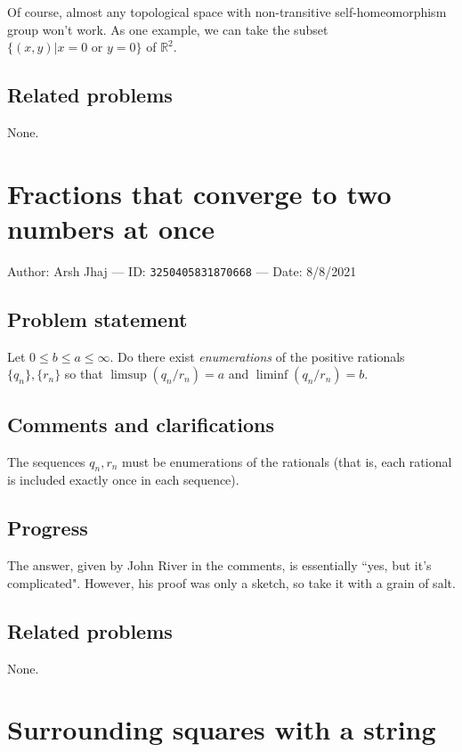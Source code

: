 \documentclass[10pt]{article}
\begin{document}
Of course, almost any topological space with non-transitive self-homeomorphism group won't work. As one example, we can take the subset $\{(x,y)\vert x=0\textrm{ or }y=0\}$ of $\mathbb{R}^2$.

\subsection{Related problems}

None.

\pagebreak

\section{Fractions that converge to two numbers at once}

Author: Arsh Jhaj --- ID: \verb`3250405831870668` --- Date: 8/8/2021

\subsection{Problem statement}

Let $0\leq b\leq a\leq\infty$. Do there exist \textit{enumerations} of the positive rationals $\{q_n\},\{r_n\}$ so that $\limsup(q_n/r_n)=a$ and $\liminf(q_n/r_n)=b$.

\subsection{Comments and clarifications}

The sequences $q_n,r_n$ must be enumerations of the rationals (that is, each rational is included exactly once in each sequence).

\subsection{Progress}

The answer, given by John River in the comments, is essentially ``yes, but it's complicated". However, his proof was only a sketch, so take it with a grain of salt.

\subsection{Related problems}

None.

\pagebreak

\section{Surrounding squares with a string}
\end{document}
